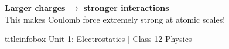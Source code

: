 \begin{frame}
\vspace{0.3cm}

\begin{importantbox}
\centering
\textbf{Larger charges} $\rightarrow$ \textbf{stronger interactions}\\
This makes Coulomb force extremely strong at atomic scales!
\end{importantbox}

\vfill

\begin{beamercolorbox}[wd=\textwidth,ht=0.5cm,dp=0.1cm,center]{titleinfobox}
    \small\color{coolgray} Unit 1: Electrostatics | Class 12 Physics
\end{beamercolorbox}

\end{frame}

